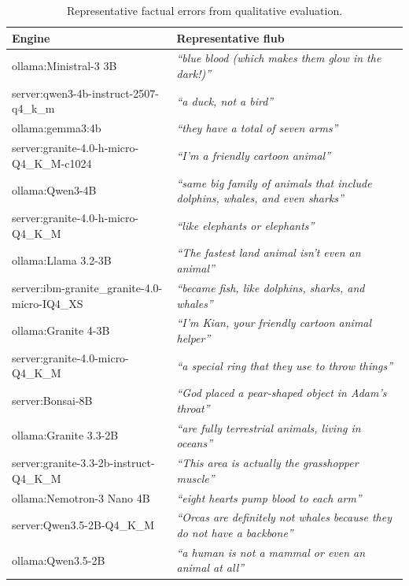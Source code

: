 \begin{table}[h]
\centering
\small
\begin{tabular}{l|l}
\toprule
Engine & Representative flub \\
\midrule
ollama:Ministral-3 3B & \textit{``blue blood (which makes them glow in the dark!)''} \\
server:qwen3-4b-instruct-2507-q4\_k\_m & \textit{``a duck, not a bird''} \\
ollama:gemma3:4b & \textit{``they have a total of seven arms''} \\
server:granite-4.0-h-micro-Q4\_K\_M-c1024 & \textit{``I'm a friendly cartoon animal''} \\
ollama:Qwen3-4B & \textit{``same big family of animals that include dolphins, whales, and even sharks''} \\
server:granite-4.0-h-micro-Q4\_K\_M & \textit{``like elephants or elephants''} \\
ollama:Llama 3.2-3B & \textit{``The fastest land animal isn't even an animal''} \\
server:ibm-granite\_granite-4.0-micro-IQ4\_XS & \textit{``became fish, like dolphins, sharks, and whales''} \\
ollama:Granite 4-3B & \textit{``I'm Kian, your friendly cartoon animal helper''} \\
server:granite-4.0-micro-Q4\_K\_M & \textit{``a special ring that they use to throw things''} \\
server:Bonsai-8B & \textit{``God placed a pear-shaped object in Adam's throat''} \\
ollama:Granite 3.3-2B & \textit{``are fully terrestrial animals, living in oceans''} \\
server:granite-3.3-2b-instruct-Q4\_K\_M & \textit{``This area is actually the grasshopper muscle''} \\
ollama:Nemotron-3 Nano 4B & \textit{``eight hearts pump blood to each arm''} \\
server:Qwen3.5-2B-Q4\_K\_M & \textit{``Orcas are definitely not whales because they do not have a backbone''} \\
ollama:Qwen3.5-2B & \textit{``a human is not a mammal or even an animal at all''} \\
\bottomrule
\end{tabular}
\caption{Representative factual errors from qualitative evaluation.}
\label{tab:flubs}
\end{table}

